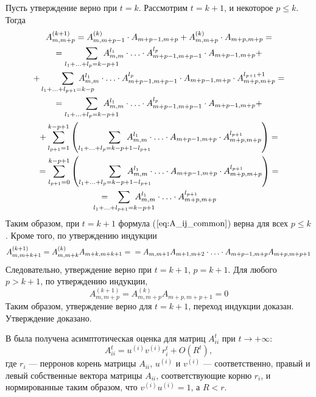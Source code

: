 \documentclass[12pt]{article}
\begin{document}
Пусть утверждение верно при $t=k$. Рассмотрим $t = k+1$, и некоторое $p \le k$. Тогда
\begin{multline*}
	A^{(k+1)}_{m,m+p} = A^{(k)}_{m,m+p-1} \cdot A_{m+p-1,m+p} + A^{(k)}_{m,m+p} \cdot A_{m+p,m+p} = \\
	= \sum_{l_1 + \ldots + l_p = k-p+1}\hspace{-20pt}A_{m,m}^{l_1} \cdot \ldots \cdot A_{m+p-1,m+p-1}^{l_p} \cdot A_{m+p-1,m+p} + \\
	+ \sum_{l_1 + \ldots + l_{p+1} = k-p}\hspace{-20pt}A_{m,m}^{l_1} \cdot \ldots \cdot A_{m+p-1,m+p-1}^{l_p} \cdot A_{m+p-1,m+p} \cdot A_{m+p,m+p}^{l_{p+1}+1} = \\
	= \sum_{l_1 + \ldots + l_p = k-p+1}\hspace{-20pt}A_{m,m}^{l_1} \cdot \ldots \cdot A_{m+p-1,m+p-1}^{l_p} \cdot A_{m+p-1,m+p} + \\
	+ \sum_{l_{p+1} = 1}^{k-p+1} \left( \sum_{l_1 + \ldots + l_p = k-p+1 - l_{p+1}}\hspace{-30pt}A_{m,m}^{l_1} \cdot \ldots \cdot A_{m+p-1,m+p} \cdot A_{m+p,m+p}^{l_{p+1}} \right) = \\
	= \sum_{l_{p+1} = 0}^{k-p+1} \left( \sum_{l_1 + \ldots + l_p = k-p+1 - l_{p+1}}\hspace{-30pt}A_{m,m}^{l_1} \cdot \ldots \cdot A_{m+p-1,m+p} \cdot A_{m+p,m+p}^{l_{p+1}} \right) = \\
	=\hspace{-20pt}\sum_{l_1 + \ldots + l_{p+1} = k-p+1}\hspace{-25pt}A_{m,m}^{l_1} \cdot \ldots \cdot A_{m+p,m+p}^{l_{p+1}}
\end{multline*}
Таким образом, при $t=k+1$ формула ($\ref{eq:A_ij_common}$) верна для всех $p \le k$. Кроме того, по утверждению индукции
\begin{equation*}
	A_{m,m+k+1}^{(k+1)} = A_{m,m+k}^{(k)}A_{m+k,m+k+1} = \\
	= A_{m,m+1} A_{m+1,m+2} \cdot \ldots \cdot A_{m+p-1,m+p} A_{m+p,m+p+1}
\end{equation*}
Следовательно, утверждение верно при $t=k+1$, $p=k+1$. Для любого $p>k+1$, по утверждению индукции,
\begin{equation*}
	A_{m,m+p}^{(k+1)} = A_{m,m+p}^{(k)}A_{m+p,m+p+1} = 0
\end{equation*}
Таким образом, утверждение верно для $t=k+1$, переход индукции доказан. Утверждение доказано.	

В \cite{lit:sev_vp} была получена асимптотическая оценка для матриц $A_{ii}^t$ при $t \rightarrow +\infty$:
\begin{equation}
\label{eq:Aii_asymp}
	A_{ii}^t = u^{(i)}v^{(i)} r_i^t + O(R^t),
\end{equation}
где $r_i$ --- перронов корень матрицы $A_{ii}$, $u^{(i)}$ и $v^{(i)}$ --- соответственно, правый и левый собственные вектора матрицы $A_{ii}$, соответствующие корню $r_i$, и нормированные таким образом, что $v^{(i)}u^{(i)} = 1$, а $R < r$.
\end{document}
